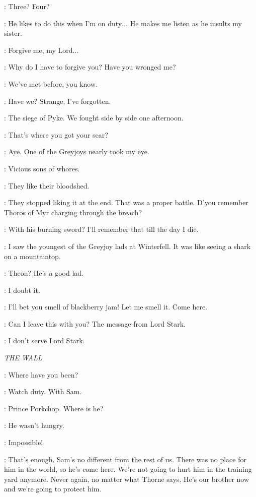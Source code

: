\JORY: Three? Four? 

\JAIME: He likes to do this when I'm on duty$\ldots$ He makes me listen as he insults my sister. 

\JORY: Forgive me, my Lord$\ldots$ 

\JAIME: Why do I have to forgive you? Have you wronged me? 

\JORY: We've met before, you know. 

\JAIME: Have we? Strange, I've forgotten. 

\JORY: The siege of Pyke. We fought side by side one afternoon. 

\JAIME: That's where you got your scar? 

\JORY: Aye. One of the Greyjoys nearly took my eye. 

\JAIME: Vicious sons of whores. 

\JORY: They like their bloodshed. 

\JAIME: They stopped liking it at the end. That was a proper battle. D'you remember Thoros of Myr charging through the breach? 

\JORY: With his burning sword? I'll remember that till the day I die. 

\JAIME: I saw the youngest of the Greyjoy lads at Winterfell. It was like seeing a shark on a mountaintop. 

\JORY: Theon? He's a good lad. 

\JAIME: I doubt it. 

\ROBERT:  I'll bet you smell of blackberry jam! Let me smell it. Come here. 

\JORY: Can I leave this with you? The message from Lord Stark. 

\JAIME: I don't serve Lord Stark. 

\scene

\textit{THE WALL}


\GRENN: Where have you been? 

\JON: Watch duty. With Sam. 

\PYP: Prince Porkchop. Where is he? 

\JON: He wasn't hungry. 

\PYP: Impossible! 

\JON: That's enough. Sam's no different from the rest of us. There was no place for him in the world, so he's come here. We're not going to hurt him in the training yard anymore. Never again, no matter what Thorne says. He's our brother now and we're going to protect him. 

